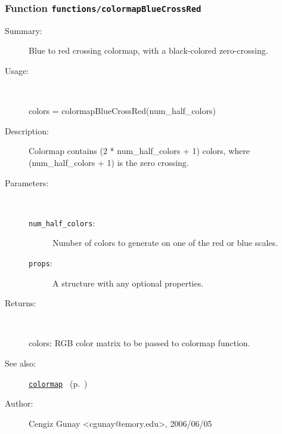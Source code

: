 \subsubsection[Function \texttt{colormapBlueCrossRed}]{Function \texttt{functions/colormapBlueCrossRed}}%
%
\label{ref_functions__colormapBlueCrossRed}%
\hypertarget{ref_functions__colormapBlueCrossRed}{}%
\begin{description}
\item[Summary:]Blue to red crossing colormap, with a black-colored zero-crossing.
%
\item[Usage:]~%
\begin{lyxcode}%
colors = colormapBlueCrossRed(num\_half\_colors)
%
\end{lyxcode}%
%
\item[Description:]%
Colormap contains (2 * num\_half\_colors + 1) colors, where (num\_half\_colors + 1) is the 
 zero crossing.
\item[Parameters:]~
\begin{description}%
\item[\texttt{num\_half\_colors}:]
 Number of colors to generate on one of the red or blue scales.
\item[\texttt{props}:]
 A structure with any optional properties.
\end{description}%
%
\item[Returns:
]~

	colors: RGB color matrix to be passed to colormap function.
%
%
\item[See also:]%
\hyperlink{ref_colormap}{\texttt{colormap}}%
\ (p.~\pageref{ref_colormap})%
%
%
\item[Author:]%
Cengiz Gunay <cgunay@emory.edu>, 2006/06/05
%
\end{description}
\methodline%
